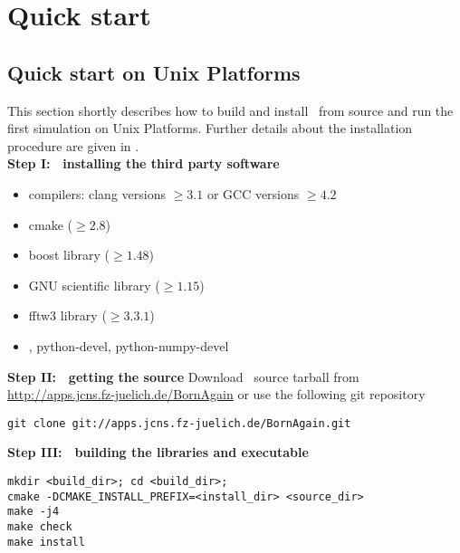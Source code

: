 \newpage
\chapter{Quick start} 

\section{Quick start on Unix Platforms}

This section shortly describes how to build and install \BornAgain\ 
from source and run the first simulation on Unix Platforms. 
Further details about the installation procedure are given in . \\

\noindent
{\bf Step I: $~$ installing the third party software}
\begin{itemize}
\item compilers: clang  versions $\geq 3.1$ or GCC versions $\geq 4.2$
\item cmake ($\geq 2.8$)
\item boost library ($\geq 1.48$)
\item GNU scientific library ($\geq 1.15$)
\item fftw3 library ($\geq 3.3.1$)
\item {}, python-devel, python-numpy-devel
\end{itemize}
\vspace*{2mm}


\noindent
{\bf Step II: $~$ getting the source} \newline
Download \BornAgain\ source tarball from \url{http://apps.jcns.fz-juelich.de/BornAgain}
or use the following git repository
\begin{lstlisting}[language=shell, style=commandline]
git clone git://apps.jcns.fz-juelich.de/BornAgain.git 
\end{lstlisting}

\vspace*{3mm}



\noindent
{\bf Step III: $~$ building the libraries and executable}
\begin{lstlisting}[language=shell, style=commandline]
mkdir <build_dir>; cd <build_dir>;
cmake -DCMAKE_INSTALL_PREFIX=<install_dir> <source_dir>
make -j4
make check
make install
\end{lstlisting}
\vspace*{3mm}


